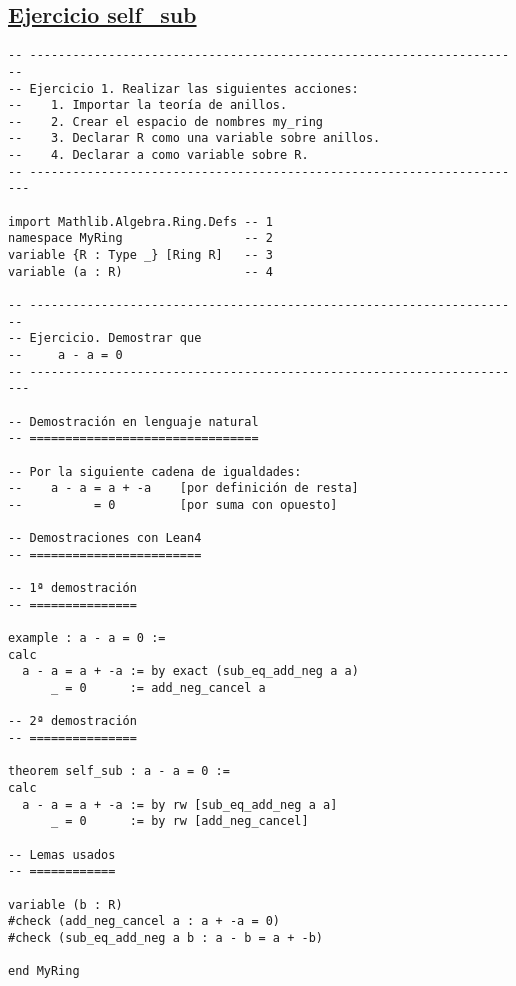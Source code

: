 \subsection{\href{./src/Basicos/self\_sub.lean}{Ejercicio self\_sub}}
\label{sec:org5edf88f}
\begin{verbatim}
-- ---------------------------------------------------------------------
-- Ejercicio 1. Realizar las siguientes acciones:
--    1. Importar la teoría de anillos.
--    2. Crear el espacio de nombres my_ring
--    3. Declarar R como una variable sobre anillos.
--    4. Declarar a como variable sobre R.
-- ----------------------------------------------------------------------

import Mathlib.Algebra.Ring.Defs -- 1
namespace MyRing                 -- 2
variable {R : Type _} [Ring R]   -- 3
variable (a : R)                 -- 4

-- ---------------------------------------------------------------------
-- Ejercicio. Demostrar que
--     a - a = 0
-- ----------------------------------------------------------------------

-- Demostración en lenguaje natural
-- ================================

-- Por la siguiente cadena de igualdades:
--    a - a = a + -a    [por definición de resta]
--          = 0         [por suma con opuesto]

-- Demostraciones con Lean4
-- ========================

-- 1ª demostración
-- ===============

example : a - a = 0 :=
calc
  a - a = a + -a := by exact (sub_eq_add_neg a a)
      _ = 0      := add_neg_cancel a

-- 2ª demostración
-- ===============

theorem self_sub : a - a = 0 :=
calc
  a - a = a + -a := by rw [sub_eq_add_neg a a]
      _ = 0      := by rw [add_neg_cancel]

-- Lemas usados
-- ============

variable (b : R)
#check (add_neg_cancel a : a + -a = 0)
#check (sub_eq_add_neg a b : a - b = a + -b)

end MyRing
\end{verbatim}

